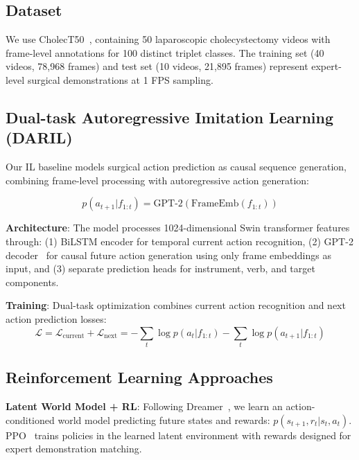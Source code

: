 \documentclass[runningheads]{llncs}
\begin{document}
\subsection{Dataset}

We use CholecT50~\cite{nwoye2022cholect50}, containing 50 laparoscopic cholecystectomy videos with frame-level annotations for 100 distinct triplet classes. The training set (40 videos, 78,968 frames) and test set (10 videos, 21,895 frames) represent expert-level surgical demonstrations at 1 FPS sampling.

\subsection{Dual-task Autoregressive Imitation Learning (DARIL)}

Our IL baseline models surgical action prediction as causal sequence generation, combining frame-level processing with autoregressive action generation:

\begin{equation}
p(a_{t+1}|f_{1:t}) = \text{GPT-2}(\text{FrameEmb}(f_{1:t}))
\end{equation}

\textbf{Architecture}: The model processes 1024-dimensional Swin transformer features~\cite{liu2021swin} through: (1) BiLSTM encoder for temporal current action recognition, (2) GPT-2 decoder~\cite{radford2019language} for causal future action generation using only frame embeddings as input, and (3) separate prediction heads for instrument, verb, and target components.

\textbf{Training}: Dual-task optimization combines current action recognition and next action prediction losses:
\begin{equation}
\mathcal{L} = \mathcal{L}_{\text{current}} + \mathcal{L}_{\text{next}} = -\sum_{t} \log p(a_t|f_{1:t}) - \sum_{t} \log p(a_{t+1}|f_{1:t})
\end{equation}

\subsection{Reinforcement Learning Approaches}

\textbf{Latent World Model + RL}: Following Dreamer~\cite{hafner2020dream}, we learn an action-conditioned world model predicting future states and rewards: $p(s_{t+1}, r_t|s_t, a_t)$. PPO~\cite{schulman2017proximal} trains policies in the learned latent environment with rewards designed for expert demonstration matching.
\end{document}
